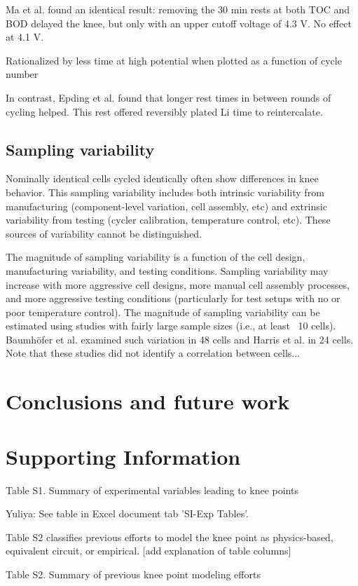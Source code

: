 \documentclass{article}
\begin{document}
Ma et al.\cite{ma_editors_2019} found an identical result: removing the 30 min rests at both TOC and BOD delayed the knee, but only with an upper cutoff voltage of 4.3 V. No effect at 4.1 V.

Rationalized by less time at high potential when plotted as a function of cycle number

In contrast, Epding et al.\cite{epding_investigation_2019} found that longer rest times in between rounds of cycling helped. This rest offered reversibly plated Li time to reintercalate.

\subsection{Sampling variability}

Nominally identical cells cycled identically often show differences in knee behavior. This sampling variability includes both intrinsic variability from manufacturing (component-level variation, cell assembly, etc) and extrinsic variability from testing (cycler calibration, temperature control, etc). These sources of variability cannot be distinguished.

The magnitude of sampling variability is a function of the cell design, manufacturing variability, and testing conditions. Sampling variability may increase with more aggressive cell designs, more manual cell assembly processes, and more aggressive testing conditions (particularly for test setups with no or poor temperature control). The magnitude of sampling variability can be estimated using studies with fairly large sample sizes (i.e., at least ~10 cells). Baumhöfer et al.\cite{baumhofer_production_2014} examined such variation in 48 cells and Harris et al.\cite{harris_failure_2017} in 24 cells. Note that these studies did not identify a correlation between cells...

\section{Conclusions and future work}

\section{Supporting Information}

 


Table S1. Summary of experimental variables leading to knee points


Yuliya: See table in Excel document tab 'SI-Exp Tables'. 


Table S2 classifies previous efforts to model the knee point as physics-based, equivalent circuit, or empirical. [add explanation of table columns]

Table S2. Summary of previous knee point modeling efforts



\end{document}
